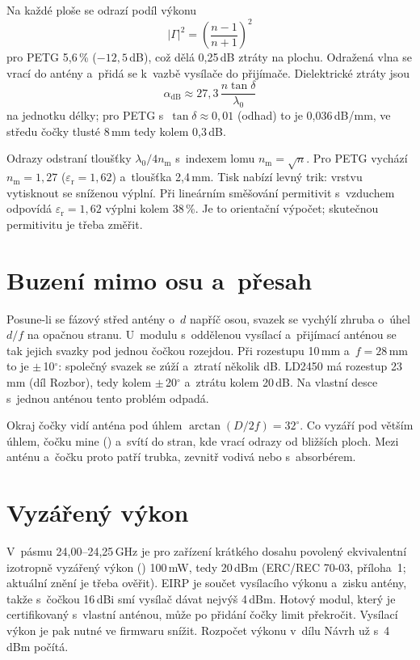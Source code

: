 \documentclass[czech]{skyren}
\begin{document}
Na každé ploše se odrazí podíl výkonu
\[
|\Gamma|^2 = \left(\frac{n-1}{n+1}\right)^2
\]
pro PETG 5,6\,\% ($-12{,}5$\,dB), což dělá 0,25\,dB ztráty na plochu.
Odražená vlna se vrací do antény a~přidá se k~vazbě vysílače do přijímače.
Dielektrické ztráty jsou
\[
\alpha_\mathrm{dB} \approx 27{,}3\,\frac{n\tan\delta}{\lambda_0}
\]
na jednotku délky; pro PETG s~$\tan\delta \approx 0{,}01$ (odhad) to je
0,036\,dB/mm, ve středu čočky tlusté 8\,mm tedy kolem 0,3\,dB.

Odrazy odstraní  tloušťky $\lambda_0/4n_\mathrm{m}$
s~indexem lomu $n_\mathrm{m} = \sqrt{n}$. Pro PETG vychází $n_\mathrm{m} = 1{,}27$
($\varepsilon_\mathrm{r} = 1{,}62$) a~tloušťka 2,4\,mm. Tisk nabízí levný
trik: vrstvu vytisknout se sníženou výplní. Při lineárním směšování
permitivit s~vzduchem odpovídá $\varepsilon_\mathrm{r} = 1{,}62$ výplni kolem
38\,\%. Je to orientační výpočet; skutečnou permitivitu je třeba změřit.

\section{Buzení mimo osu a~přesah}

Posune-li se fázový střed antény o~$d$ napříč osou, svazek se vychýlí zhruba
o~úhel $d/f$ na opačnou stranu. U~modulu s~oddělenou vysílací a~přijímací
anténou se tak jejich svazky pod jednou čočkou rozejdou. Při rozestupu
10\,mm a~$f = 28$\,mm to je $\pm$\,10$^\circ$: společný svazek se zúží
a~ztratí několik dB. LD2450 má rozestup 23\,mm (díl Rozbor), tedy kolem
$\pm$\,20$^\circ$ a~ztrátu kolem 20\,dB. Na vlastní desce s~jednou anténou
tento problém odpadá.

Okraj čočky vidí anténa pod úhlem $\arctan(D/2f) = 32^\circ$. Co vyzáří pod
větším úhlem, čočku mine () a~svítí do stran, kde vrací
odrazy od bližších ploch. Mezi anténu a~čočku proto patří trubka, zevnitř
vodivá nebo s~absorbérem.

\section{Vyzářený výkon}

V~pásmu 24,00--24,25\,GHz je pro zařízení krátkého dosahu povolený
ekvivalentní izotropně vyzářený výkon () 100\,mW, tedy
20\,dBm (ERC/REC 70-03, příloha~1; aktuální znění je třeba ověřit). EIRP je
součet vysílacího výkonu a~zisku antény, takže s~čočkou 16\,dBi smí vysílač
dávat nejvýš 4\,dBm. Hotový modul, který je certifikovaný s~vlastní anténou,
může po přidání čočky limit překročit. Vysílací výkon je pak nutné ve
firmwaru snížit. Rozpočet výkonu v~dílu Návrh už s~4\,dBm počítá.
\end{document}
